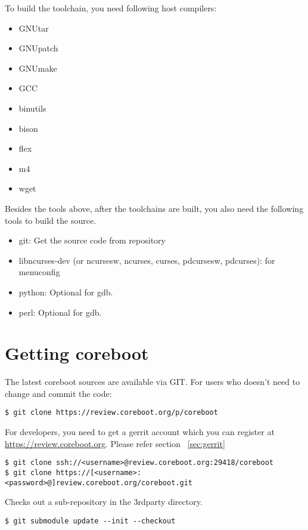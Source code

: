 \documentclass[titlepage,12pt]{article}
\begin{document}
To build the toolchain, you need following host compilers:

 \begin{itemize}
 \item GNUtar
 \item GNUpatch
 \item GNUmake
 \item GCC
 \item binutils
 \item bison
 \item flex
 \item m4
 \item wget
 \end{itemize}

Besides the tools above, after the toolchains are built, you also need the following
tools to build the source.

 \begin{itemize}
 \item git: Get the source code from repository
 \item libncurses-dev (or ncursesw, ncurses, curses, pdcursesw, pdcurses): for menuconfig
 \item python: Optional for gdb.
 \item perl: Optional for gdb.
 \end{itemize}

%
%

\section{Getting coreboot}
The latest coreboot sources are available via GIT.
For users who doesn't need to change and commit the code:
{ \small
\begin{verbatim}
$ git clone https://review.coreboot.org/p/coreboot
\end{verbatim}
}
For developers, you need to get a gerrit account which you can register
at \url{https://review.coreboot.org}. Please refer section ~\ref{sec:gerrit}
{ \small
\begin{verbatim}
$ git clone ssh://<username>@review.coreboot.org:29418/coreboot
$ git clone https://[<username>:<password>@]review.coreboot.org/coreboot.git
\end{verbatim}
}

Checks out a sub-repository in the 3rdparty directory.
{ \small
\begin{verbatim}
$ git submodule update --init --checkout
\end{verbatim}
}
\end{document}
